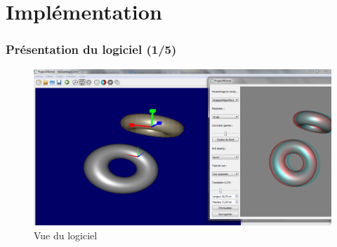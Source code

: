 \documentclass{beamer}
\begin{document}

%


%


\section{Implémentation}

\begin{frame}
\frametitle{Présentation du logiciel (1/5)}
\begin{figure}
\includegraphics[scale=0.22]{logiciel.png}
\caption{Vue du logiciel}
\end{figure}
\end{frame}
\end{document}
